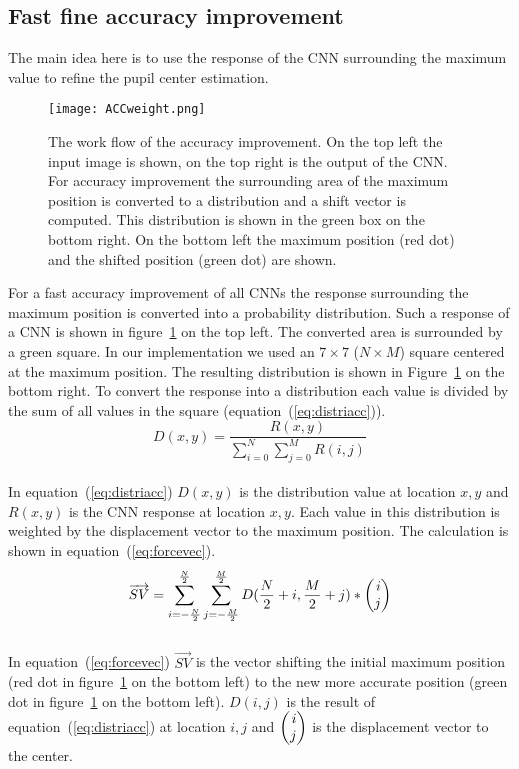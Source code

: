 \subsection{Fast fine accuracy improvement}
\label{sec:ffai}
The main idea here is to use the response of the CNN surrounding the maximum value to refine the pupil center estimation.
\begin{figure}[h]
	\begin{center}
		\texttt{[image: ACCweight.png]}
	\end{center}
	\caption{
		The work flow of the accuracy improvement. On the top left the input image is shown, on the top right is the output of the CNN. For accuracy improvement the surrounding area of the maximum position is converted to a distribution and a shift vector is computed. This distribution is shown in the green box on the bottom right. On the bottom left the maximum position (red dot) and the shifted position (green dot) are shown.
	}
	\label{fig:accimp}
\end{figure}
For a fast accuracy improvement of all CNNs the response surrounding the maximum position is converted into a probability distribution. Such a response of a CNN is shown in figure~\ref{fig:accimp} on the top left. The converted area is surrounded by a green square. In our implementation we used an $7 \times 7$ ($N \times M$) square centered at the maximum position. The resulting distribution is shown in Figure~\ref{fig:accimp} on the bottom right. To convert the response into a distribution each value is divided by the sum of all values in the square (equation~(\ref{eq:distriacc})).
\begin{equation}
D(x,y)=\frac{R(x,y)}{\sum_{i=0}^{N}\sum_{j=0}^{M}R(i,j)}
\label{eq:distriacc}
\end{equation}\\
In equation~(\ref{eq:distriacc}) $D(x,y)$ is the distribution value at location $x,y$ and $R(x,y)$ is the CNN response at location $x,y$. Each value in this distribution is weighted by the displacement vector to the maximum position. The calculation is shown in equation~(\ref{eq:forcevec}).
\begin{equation}
\overrightarrow{SV}=\sum_{i=-\frac{N}{2}}^{\frac{N}{2}}\sum_{j=-\frac{M}{2}}^{\frac{M}{2}}D(\frac{N}{2}+i,\frac{M}{2}+j)*\Spvek{i;j}
\label{eq:forcevec}
\end{equation}\\
In equation~(\ref{eq:forcevec}) $\overrightarrow{SV}$ is the vector shifting the initial maximum position (red dot in figure~\ref{fig:accimp} on the bottom left) to the new more accurate position (green dot in figure~\ref{fig:accimp} on the bottom left). $D(i,j)$ is the result of equation~(\ref{eq:distriacc}) at location $i,j$ and $\Spvek{i;j}$ is the displacement vector to the center.






